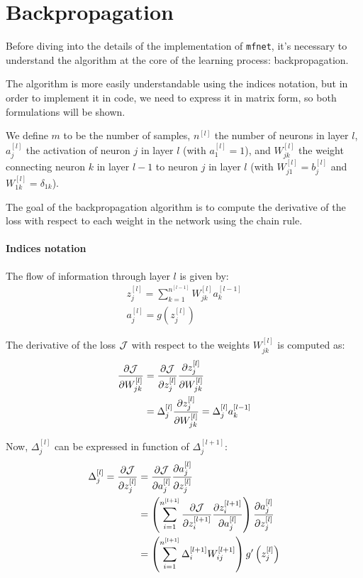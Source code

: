 \section{Backpropagation} \label{sec:backprop}
Before diving into the details of the implementation of \texttt{mfnet}, it's necessary to understand the algorithm at the core of the learning process: backpropagation.

The algorithm is more easily understandable using the indices notation, but in order to implement it in code, we need to express it in matrix form, so both formulations will be shown.

{\color{red}
We define $m$ to be the number of samples, $n^{[l]}$ the number of neurons in layer $l$, $a_j^{[l]}$ the activation of neuron $j$ in layer $l$ (with $a_1^{[l]} = 1$), and $W_{jk}^{[l]}$ the weight connecting neuron $k$ in layer $l-1$ to neuron $j$ in layer $l$ (with $W_{j1}^{[l]} = b_j^{[l]}$ and $W_{1k}^{[l]} = \delta_{1k}$).
}

The goal of the backpropagation algorithm is to compute the derivative of the loss with respect to each weight in the network using the chain rule.

\paragraph{Indices notation}
The flow of information through layer $l$ is given by:
\begin{gather*}
    z_j^{[l]} = \sum_{k=1}^{n^{[l-1]}} W_{jk}^{[l]} a_k^{[l-1]} \\
    a_j^{[l]} = g\left(z_j^{[l]}\right)
\end{gather*}

The derivative of the loss $\mathcal{J}$ with respect to the weights $W_{jk}^{[l]}$ is computed as:
\begin{align*}
    \pdv{\mathcal{J}}{W_{jk}^{[l]}} &= \pdv{\mathcal{J}}{z_j^{[l]}} \pdv{z_j^{[l]}}{W_{jk}^{[l]}}\\
    &= \Delta_j^{[l]} \pdv{z_j^{[l]}}{W_{jk}^{[l]}} = \Delta_j^{[l]} a_k^{[l-1]}
\end{align*}

Now, $\Delta_j^{[l]}$ can be expressed in function of $\Delta_j^{[l + 1]}$:
\begin{align*}
    \Delta_j^{[l]} = \pdv{\mathcal{J}}{z_j^{[l]}} &= \pdv{\mathcal{J}}{a_j^{[l]}} \pdv{a_j^{[l]}}{z_j^{[l]}}\\
    &= \left( \sum_{i=1}^{n^{[l + 1]}} \pdv{\mathcal{J}}{z_i^{[l+1]}} \pdv{z_i^{[l+1]}}{a_j^{[l]}} \right) \pdv{a_j^{[l]}}{z_j^{[l]}}\\
    &= \left( \sum_{i=1}^{n^{[l + 1]}} \Delta_i^{[l+1]} W_{ij}^{[l+1]} \right) g'\left(z_j^{[l]}\right)
\end{align*}

